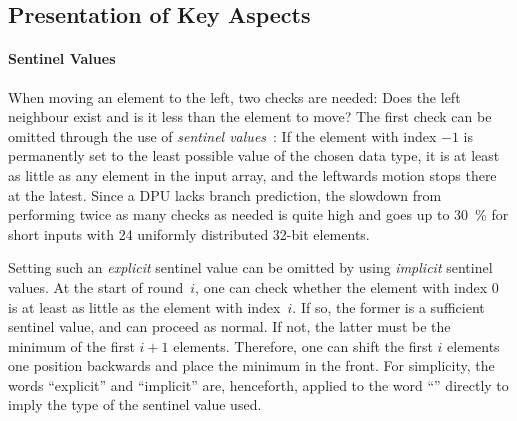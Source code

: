 \subsection{Presentation of Key Aspects}

\paragraph{Sentinel Values}
When moving an element to the left, two checks are needed:
Does the left neighbour exist and is it less than the element to move?
The first check can be omitted through the use of \emph{sentinel values}~\cite[93]{wirth1975algorithmen}:
If the element with index \(-1\) is permanently set to the least possible value of the chosen data type, it is at least as little as any element in the input array, and the leftwards motion stops there at the latest.
Since a \ac{DPU} lacks branch prediction, the slowdown from performing twice as many checks as needed is quite high and goes up to \qty{30}{\percent} for short inputs with 24 uniformly distributed 32-bit elements.

Setting such an \emph{explicit} sentinel value can be omitted by using \emph{implicit} sentinel values.
At the start of round~\(i\), one can check whether the element with index \(0\) is at least as little as the element with index~\(i\).
If so, the former is a sufficient sentinel value, and \IS{} can proceed as normal.
If not, the latter must be the minimum of the first \(i + 1\) elements.
Therefore, one can shift the first \(i\) elements one position backwards and place the minimum in the front.
For simplicity, the words \enquote{explicit} and \enquote{implicit} are, henceforth, applied to the word \enquote{\IS{}} directly to imply the type of the sentinel value used.
